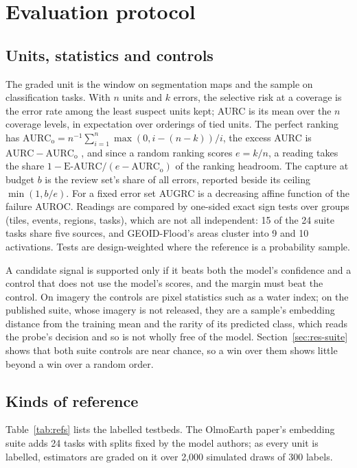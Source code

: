 \documentclass[11pt,a4paper]{article}
\begin{document}
\section{Evaluation protocol}
\label{sec:protocol}

\subsection{Units, statistics and controls}

The graded unit is the window on segmentation maps and the sample on classification tasks. With $n$ units and
$k$ errors, the selective risk at a coverage is the error rate among the least suspect units kept; AURC is
its mean over the $n$ coverage levels, in expectation over orderings of tied units. The perfect ranking has
$\mathrm{AURC}_{\mathrm{o}} = n^{-1}\sum_{i=1}^{n} \max(0, i - (n - k))/i$, the excess AURC is
$\mathrm{AURC} - \mathrm{AURC}_{\mathrm{o}}$ \citep{geifman2019}, and since a random ranking scores $e = k/n$, a reading
takes the share $1 - \text{E-AURC}/(e - \mathrm{AURC}_{\mathrm{o}})$ of the ranking headroom. The capture at budget $b$
is the review set's share of all errors, reported beside its ceiling $\min(1, b/e)$. For a fixed error set AUGRC
\citep{traub2024} is a decreasing affine function of the failure AUROC. Readings are compared by one-sided exact sign
tests over groups (tiles, events, regions, tasks), which are not all independent: 15 of the 24 suite tasks share five
sources, and GEOID-Flood's areas cluster into 9 and 10 activations. Tests are design-weighted \citep{olofsson2014} where the reference is
a probability sample.

A candidate signal is supported only if it beats both the model's confidence and a control that does not use the
model's scores, and the margin must beat the control. On imagery the controls are pixel statistics such as a water index; on
the published suite, whose imagery is not released, they are a sample's embedding distance from the training mean and
the rarity of its predicted class, which reads the probe's decision and so is not wholly free of the model. Section~\ref{sec:res-suite} shows that both suite controls are near chance, so a
win over them shows little beyond a win over a random order.

\subsection{Kinds of reference}

Table~\ref{tab:refs} lists the labelled testbeds. The OlmoEarth paper's embedding suite \citep{herzog2025} adds 24
tasks with splits fixed by the model authors; as every unit is labelled, estimators are graded on it over 2,000
simulated draws of 300 labels.
\end{document}
